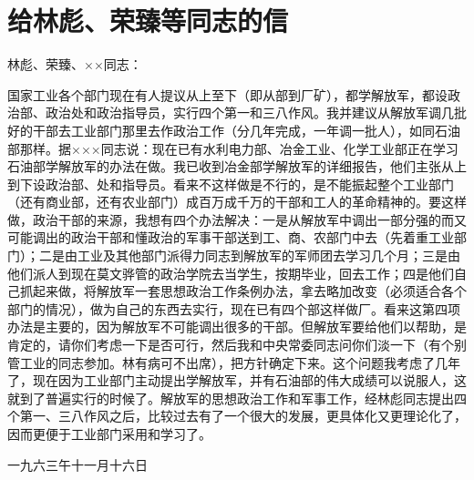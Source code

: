 \section[给林彪、荣臻等同志的信（一九六三年十一月十六日）]{给林彪、荣臻等同志的信}


林彪、荣臻、××同志：

国家工业各个部门现在有人提议从上至下（即从部到厂矿），都学解放军，都设政治部、政治处和政治指导员，实行四个第一和三八作风。我并建议从解放军调几批好的干部去工业部门那里去作政治工作（分几年完成，一年调一批人），如同石油部那样。据×××同志说：现在已有水利电力部、冶金工业、化学工业部正在学习石油部学解放军的办法在做。我已收到冶金部学解放军的详细报告，他们主张从上到下设政治部、处和指导员。看来不这样做是不行的，是不能振起整个工业部门（还有商业部，还有农业部门）成百万成千万的干部和工人的革命精神的。要这样做，政治干部的来源，我想有四个办法解决：一是从解放军中调出一部分强的而又可能调出的政治干部和懂政治的军事干部送到工、商、农部门中去（先着重工业部门）；二是由工业及其他部门派得力同志到解放军的军师团去学习几个月；三是由他们派人到现在莫文骅管的政治学院去当学生，按期毕业，回去工作；四是他们自己抓起来做，将解放军一套思想政治工作条例办法，拿去略加改变（必须适合各个部门的情况），做为自己的东西去实行，现在已有四个部这样做厂。看来这第四项办法是主要的，因为解放军不可能调出很多的干部。但解放军要给他们以帮助，是肯定的，请你们考虑一下是否可行，然后我和中央常委同志问你们淡一下（有个别管工业的同志参加。林有病可不出席），把方针确定下来。这个问题我考虑了几年了，现在因为工业部门主动提出学解放军，并有石油部的伟大成绩可以说服人，这就到了普遍实行的时候了。解放军的思想政治工作和军事工作，经林彪同志提出四个第一、三八作风之后，比较过去有了一个很大的发展，更具体化又更理论化了，因而更便于工业部门采用和学习了。

{\raggedleft 一九六三午十一月十六日\par}
